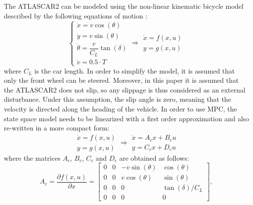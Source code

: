 \documentclass[conference,11pt]{IEEEtran}
\renewcommand{\vec}[1]{\ensuremath{\boldsymbol{\mathit{#1}}}}
\begin{document}
The ATLASCAR2 can be modeled using the non-linear kinematic bicycle model described by the following equations of motion \cite{safety} \cite{swarms}:
\begin{equation*}
\label{eqn:dynamics_model_obstacle_avoidance}
\left \{ \begin{array}{llll}
\dot{x} = v\cos(\theta)\\
\dot{y} = v\sin(\theta)\\
\dot{\theta} =\dfrac{v}{C_L}\tan(\delta)\\
\dot{v} =0.5 \cdot T
\end{array} 
\right .
\Longrightarrow 
\begin{array}{llll}
\dot{\vec{x}} = \vec{f}(\vec{x},\vec{u})\\
\vec{y} = \vec{g}(\vec{x},\vec{u})
\end{array}
\end{equation*}
where $C_L$ is the car length. In order to simplify the model, it is assumed that only the front wheel can be steered. Moreover, in this paper it is assumed that the ATLASCAR2 does not slip, so any slippage is thus considered as an external disturbance. Under this assumption, the slip angle is zero, meaning that the velocity is directed along the heading of the vehicle. In order to use MPC, the state space model needs to be linearized with a first order approximation and also re-written in a more compact form:
\begin{equation}
\label{eqn:dynamics_model_non_linear}
\begin{array}{llll}
\dot{\vec{x}} = \vec{f}(\vec{x},\vec{u})\\
\vec{y} = \vec{g}(\vec{x},\vec{u})
\end{array} \Longrightarrow
\begin{array}{ll}
\dot{\vec{x}} =\vec{A}_c \vec{x}+ \vec{B}_c \vec{u}\\
\vec{y} =\vec{C}_c \vec{x} + \vec{D}_c \vec{u}
\end{array}
\end{equation}
where the matrices $\vec{A}_c$, $\vec{B}_c$, $\vec{C}_c$ and $\vec{D}_c$ are obtained as follows:
\[ 
\vec{A}_c=\frac{\partial \vec{f}(\vec{x},\vec{u})}{\partial \vec{x}}=\begin{bmatrix}
0&0&-v\sin(\theta)&\cos(\theta)\\
0&0&v\cos(\theta)&\sin(\theta)\\
0&0&0&\tan(\delta)/C_L\\
0&0&0&0
\end{bmatrix},
\]
\end{document}
